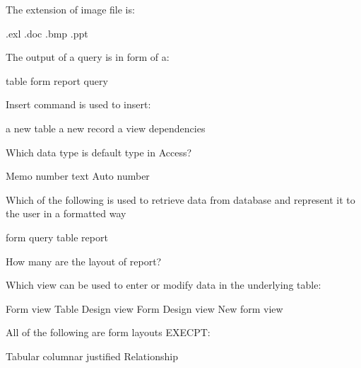 \documentclass{exam}
\begin{document}
\begin{questions}
The extension of image file is:\\
\begin{oneparchoices}
\choice .exl
\choice .doc
\choice .bmp
\choice .ppt
\end{oneparchoices}
\question 

The output of a query is in form of a:\\
\begin{oneparchoices}
\choice table
\choice form
\choice report
\choice query
\end{oneparchoices}
\question 

Insert command is used to insert:\\
\begin{oneparchoices}
\choice a new table
\choice a new record
\choice a view
\choice dependencies
\end{oneparchoices}
\question 

Which data type is default type in Access?\\
\begin{oneparchoices}
\choice Memo
\choice number
\choice text
\choice Auto number
\end{oneparchoices}
\question 

Which of the following is used to retrieve data from database and represent it to the user in a formatted way\\
\begin{oneparchoices}
\choice form
\choice query
\choice table
\choice report
\end{oneparchoices}
\question 

How many are the layout of report?\\
\begin{oneparchoices}
\end{oneparchoices}
\question 

Which view can be used to enter or modify data in the underlying table:\\
\begin{oneparchoices}
\choice Form view
\choice Table Design view
\choice Form Design view
\choice New form view
\end{oneparchoices}
\question 

All of the following are form layouts EXECPT:\\
\begin{oneparchoices}
\choice Tabular
\choice columnar
\choice justified
\choice Relationship
\end{oneparchoices}
\question 


\end{questions}
\end{document}
